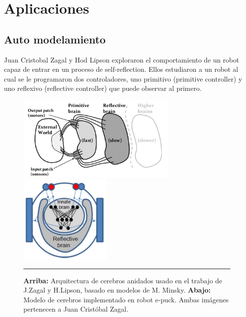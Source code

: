 
\chapter{Aplicaciones} %

\label{ChapterX} %



\section{Auto modelamiento}

Juan Cristobal Zagal y Hod Lipson \cite{ZagalL09} exploraron el comportamiento de un robot capaz de entrar en un proceso de self-reflection. Ellos estudiaron a un robot al cual se le programaron dos controladores, uno primitivo (primitive controller) y uno reflexivo (reflective controller) que puede observar al primero.

\begin{figure}[htbp]
	\centering
		\includegraphics[width=0.7\textwidth]{./Figures/arquitectura_cerebro.png}
		\includegraphics[width=0.4\textwidth]{./Figures/automodelado_epuck.png}
		\rule{35em}{0.5pt}
	\caption[Automodelado]{\textbf{Arriba:} Arquitectura de cerebros anidados usado en el trabajo de J.Zagal y H.Lipson, basado en modelos de M. Minsky. \textbf{Abajo:} Modelo de cerebros implementado en robot e-puck. Ambas imágenes  pertenecen a Juan Cristóbal Zagal.}
	\label{fig:Automodelado}
\end{figure}

